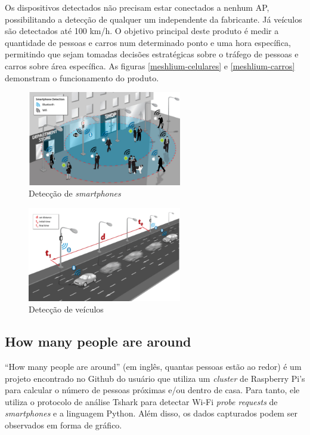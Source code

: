 Os dispositivos detectados não precisam
estar conectados a nenhum AP, possibilitando a detecção de qualquer um
independente da fabricante. Já veículos são detectados até 100 km/h. O objetivo
principal deste produto é medir a quantidade de pessoas e carros num determinado
ponto e uma hora específica, permitindo que sejam tomadas decisões estratégicas
sobre o tráfego de pessoas e carros sobre área específica. As figuras
\autoref{meshlium-celulares} e \autoref{meshlium-carros} demonstram o
funcionamento do produto.

\begin{figure}[htb]
  \caption{\label{meshlium-celulares}Detecção de \emph{smartphones}}
  \begin{center}
    \includegraphics[width=0.60\textwidth]{img/meshlium-celulares.png}
  \end{center}
\end{figure}

\begin{figure}[htb]
  \caption{\label{meshlium-carros}Detecção de veículos}
  \begin{center}
    \includegraphics[width=0.60\textwidth]{img/meshlium-carros.png}
  \end{center}
\end{figure}

\subsection{How many people are around}
``How many people are around'' (em inglês, quantas pessoas estão ao redor) é um projeto encontrado no Github do usuário  que utiliza um \emph{cluster} de Raspberry Pi's para calcular o número de pessoas próximas e/ou dentro de casa. Para tanto, ele utiliza o protocolo de análise Tshark para detectar Wi-Fi \emph{probe requests} de \emph{smartphones} e a linguagem Python. Além disso, os dados capturados podem ser observados em forma de gráfico.
